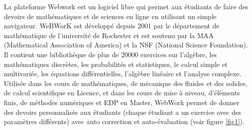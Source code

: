 \documentclass[12pt,oneside,french]{article}
\begin{document}
La plateforme Webwork\cite{webwork} est un logiciel libre qui permet aux
étudiants de faire des devoirs de mathématiques et de sciences en ligne
en utilisant un simple navigateur.
WeBWorK est développé depuis 2001 par le département de mathématique de
l'université de Rochester et est soutenu par la MAA (Mathematical Association
of America) et la NSF (National Science Foundation). Il contient une
bibliothèque de plus de 20000 exercices  sur  l'algèbre, les mathématiques
discrètes, les probabilités et statistiques, le calcul simple et multivariée,
les équations différentielles, l'algèbre linéaire et l'analyse complexe.
Utilisée dans les cours de mathématiques, de mécanique des fluides et des
solides, de calcul scientifique en Licence, et dans les cours de mise à niveau,
d'éléments finis, de méthodes numériques et EDP en Master, WebWork permet de
donner des devoirs personnalisés aux étudiants (chaque étudiant a un exercice
avec des paramètres différents) avec auto correction et auto-évaluation (voir figure \ref{fig1}). 
\end{document}
